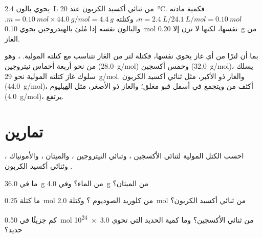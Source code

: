 \begin{example}\label{ex:g10:the-mole:balloon}
يحوي بالون \qty{2.4}{L} من ثنائي أكسيد الكربون عند \qty{20}{\celsius}.
فكمية مادته $n = \qty{2.4}{L} / \qty{24.1}{L/mol} = \qty{0.10}{mol}$،
وكتلته $m = \qty{0.10}{mol} \times \qty{44.0}{g/mol} =
\qty{4.4}{g}$. والبالون نفسه إذا مُلئ بالهيدروجين يحوي
\qty{0.10}{mol} نفسها، لكنها لا تزن إلا \qty{0.20}{g} من الغاز.
\end{example}

\begin{remark}\label{rem:g10:the-mole:heavy}
بما أن لترًا من أي غاز يحوي  نفسها، فكتلة لتر من الغاز تتناسب مع
كتلته المولية. ، وهو  من نحو أربعة أخماس نيتروجين
(\qty{28.0}{g/mol}) وخمس أكسجين (\qty{32.0}{g/mol})، يسلك سلوك غاز كتلته
المولية نحو \qty{29}{g/mol}. والغاز ذو  الأكبر، مثل ثنائي أكسيد
الكربون (\qty{44.0}{g/mol})، أكثف من  ويتجمع في أسفل قبو مغلق؛ والغاز
ذو  الأصغر، مثل الهيليوم
(\qty{4.0}{g/mol})، يرتفع.
\end{remark}

\section{تمارين}

\begin{exercise}[$\star$]\label{exo:g10:the-mole:1}
احسب الكتل المولية لثنائي الأكسجين ، وثنائي النيتروجين ،
والميثان ، والأمونياك ، وثنائي أكسيد الكربون .
\end{exercise}

\begin{exercise}[$\star$]\label{exo:g10:the-mole:2}
ما  في \qty{36.0}{g} من الماء؟ وفي
\qty{4.0}{g} من الميثان؟
\end{exercise}

\begin{exercise}[$\star$]\label{exo:g10:the-mole:3}
ما كتلة \qty{0.25}{mol} من كلوريد الصوديوم ؟ وكتلة
\qty{2.0}{mol} من ثنائي أكسيد الكربون؟
\end{exercise}

\begin{exercise}[$\star$]\label{exo:g10:the-mole:4}
كم جزيئًا في \qty{0.50}{mol} من ثنائي الأكسجين؟ وما كمية الحديد التي تحوي
\num{3.0e24}  حديد؟
\end{exercise}

